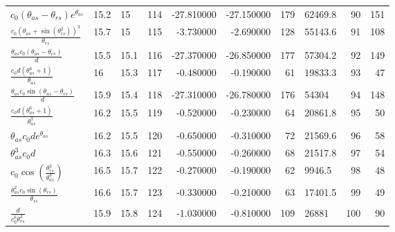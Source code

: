 \begin{tabularx}{\textwidth}{lllrrrrlrr}
$ c_{0} \left(\theta_{as} - \theta_{rs}\right) e^{\theta_{as}} $  &  15.2  &  15\phantom{.0}  &  114  &  -27.810000  &  -27.150000  &  179  &  62469.8  &  90\phantom{.000000}  &  151\phantom{.000000}  \\ 
$ \displaystyle\frac{c_{0} \left(\theta_{as} + \sin{\left(\theta_{rs}^{2} \right)}\right)^{3}}{\theta_{rs}} $  &  15.7  &  15\phantom{.0}  &  115  &  -3.730000  &  -2.690000  &  128  &  55143.6  &  91\phantom{.000000}  &  108\phantom{.000000}  \\ 
$ \displaystyle\frac{\theta_{as} c_{0} \left(\theta_{as} - \theta_{rs}\right)}{d} $  &  15.5  &  15.1  &  116  &  -27.370000  &  -26.850000  &  177  &  57304.2  &  92\phantom{.000000}  &  149\phantom{.000000}  \\ 
$ \displaystyle\frac{c_{0} d \left(\theta_{as}^{4} + 1\right)}{\theta_{as}} $  &  16\phantom{.0}  &  15.3  &  117  &  -0.480000  &  -0.190000  &  61  &  19833.3  &  93\phantom{.000000}  &  47\phantom{.000000}  \\ 
$ \displaystyle\frac{\theta_{as} c_{0} \sin{\left(\theta_{as} - \theta_{rs} \right)}}{d} $  &  15.9  &  15.4  &  118  &  -27.310000  &  -26.780000  &  176  &  54304\phantom{.0}  &  94\phantom{.000000}  &  148\phantom{.000000}  \\ 
$ \displaystyle\frac{c_{0} d \left(\theta_{as}^{6} + 1\right)}{\theta_{as}^{3}} $  &  16.2  &  15.5  &  119  &  -0.520000  &  -0.230000  &  64  &  20861.8  &  95\phantom{.000000}  &  50\phantom{.000000}  \\ 
$ \theta_{as} c_{0} d e^{\theta_{as}} $  &  16.2  &  15.5  &  120  &  -0.650000  &  -0.310000  &  72  &  21569.6  &  96\phantom{.000000}  &  58\phantom{.000000}  \\ 
$ \theta_{as}^{3} c_{0} d $  &  16.3  &  15.6  &  121  &  -0.550000  &  -0.260000  &  68  &  21517.8  &  97\phantom{.000000}  &  54\phantom{.000000}  \\ 
$ c_{0} \cos{\left(\displaystyle\frac{\theta_{rs}^{3}}{\theta_{as}^{3}} \right)} $  &  16.5  &  15.7  &  122  &  -0.270000  &  -0.190000  &  62  &  9946.5  &  98\phantom{.000000}  &  48\phantom{.000000}  \\ 
$ \displaystyle\frac{\theta_{as}^{2} c_{0} \sin{\left(\theta_{rs} \right)}}{\theta_{rs}} $  &  16.6  &  15.7  &  123  &  -0.330000  &  -0.210000  &  63  &  17401.5  &  99\phantom{.000000}  &  49\phantom{.000000}  \\ 
$ \displaystyle\frac{d}{c_{0}^{6} \theta_{rs}^{3}} $  &  15.9  &  15.8  &  124  &  -1.030000  &  -0.810000  &  109  &  26881\phantom{.0}  &  100\phantom{.000000}  &  90\phantom{.000000}  \\ 

\end{tabularx}
